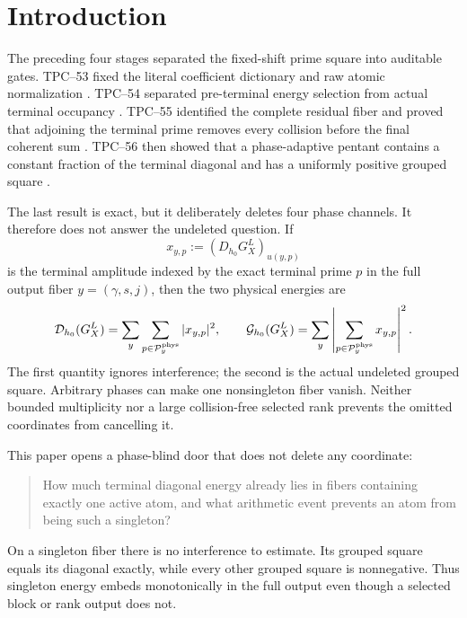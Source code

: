 \section{Introduction}
\label{sec:tpc57-introduction}

The preceding four stages separated the fixed-shift prime square into
auditable gates.  TPC--53 fixed the literal coefficient dictionary and raw
atomic normalization \citep{WangTPC53}.  TPC--54 separated pre-terminal
energy selection from actual terminal occupancy \citep{WangTPC54}.
TPC--55 identified the complete residual fiber and proved that adjoining
the terminal prime removes every collision before the final coherent sum
\citep{WangTPC55}.  TPC--56 then showed that a phase-adaptive pentant
contains a constant fraction of the terminal diagonal and has a uniformly
positive grouped square \citep{WangTPC56}.

The last result is exact, but it deliberately deletes four phase channels.
It therefore does not answer the undeleted question.  If
\begin{equation}
 x_{y,p}
 :=(D_{h_0}G_X^L)_{u(y,p)}
 \label{eq:tpc57-intro-amplitude}
\end{equation}
is the terminal amplitude indexed by the exact terminal prime \(p\) in the
full output fiber \(y=(\gamma,s,j)\), then the two physical energies are
\begin{equation}
 \mathcal D_{h_0}(G_X^L)
 =\sum_y\sum_{p\in\mathcal P_y^{\rm phys}}|x_{y,p}|^2,
 \qquad
 \mathcal G_{h_0}(G_X^L)
 =\sum_y\left|\sum_{p\in\mathcal P_y^{\rm phys}}x_{y,p}\right|^2.
 \label{eq:tpc57-intro-two-energies}
\end{equation}
The first quantity ignores interference; the second is the actual
undeleted grouped square.  Arbitrary phases can make one nonsingleton fiber
vanish.  Neither bounded multiplicity nor a large collision-free selected
rank prevents the omitted coordinates from cancelling it.

This paper opens a phase-blind door that does not delete any coordinate:
\begin{quote}
How much terminal diagonal energy already lies in fibers containing exactly
one active atom, and what arithmetic event prevents an atom from being such
a singleton?
\end{quote}
On a singleton fiber there is no interference to estimate.  Its grouped
square equals its diagonal exactly, while every other grouped square is
nonnegative.  Thus singleton energy embeds monotonically in the full
output even though a selected block or rank output does not.

